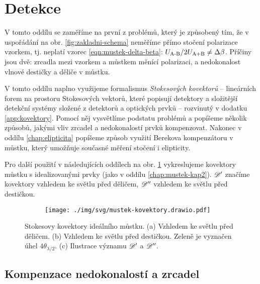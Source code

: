 \section{Detekce}
\label{chap:detekce}

V tomto oddílu se zaměříme na první z problémů, který je způsobený tím, že v uspořádání na obr. \ref{fig:zakladni-schema} neměříme přímo stočení polarizace vzorkem, tj. neplatí vzorec \eqref{eqn:mustek-delta-beta}: $U_\textrm{A-B}/2U_\textrm{A+B}\neq\Delta\beta$.
Příčiny jsou dvě: zrcadla mezi vzorkem a můstkem měnící polarizaci, a nedokonalost vlnové destičky a děliče v můstku.

V tomto oddílu naplno využijeme formalismus \emph{Stokesových kovektorů} -- lineárních forem na prostoru Stokesových vektorů, které popisují detektory a složitější detekční systémy složené z detektorů a optických prvků -- rozvinutý v dodatku \ref{app:kovektory}.
Pomocí něj vysvětlíme podstatu problémů a popíšeme několik způsobů, jakými vliv zrcadel a nedokonalostí prvků kompenzovat.
Nakonec v oddílu \ref{chap:elipticita} popíšeme způsob využití Berekova kompenzátoru v můstku, který umožňuje současné měření stočení i elipticity.

Pro další použití v následujících oddílech na obr. \ref{fig:kovektor-ideal-mustek} vykreslujeme kovektory můstku s idealizovanými prvky (jako v oddílu \ref{chap:mustek-kap2}).
$\mathscr{D}'$ značíme kovektory vzhledem ke světlu před děličem, $\mathscr{D}''$ vzhledem ke světlu před destičkou.

\begin{figure}[htbp]
    \centering
    \begin{subfigure}{.35\textwidth}
        \centering
        
    \end{subfigure}%
    \begin{subfigure}{.34\textwidth}
        \centering
        
    \end{subfigure}%
    \begin{subfigure}{.3\textwidth}
        \centering
        \texttt{[image: ./img/svg/mustek-kovektory.drawio.pdf]}
    \end{subfigure}
    \caption{Stokesovy kovektory ideálního můstku. (a) Vzhledem ke světlu před děličem. (b) Vzhledem ke světlu před destičkou. Zeleně je vyznačen úhel $4\theta_{\lambda/2}$. (c) Ilustrace významu $\mathscr{D}'$ a $\mathscr{D}''$.}
    \label{fig:kovektor-ideal-mustek}
\end{figure}

\subsection{Kompenzace nedokonalostí a zrcadel}
\label{chap:kompenzace}

